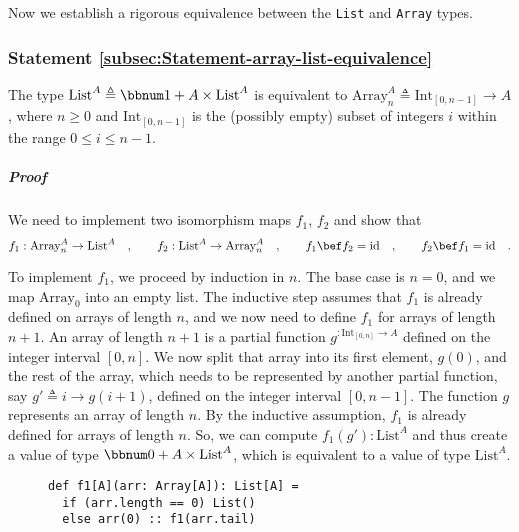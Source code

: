 Now we establish a rigorous equivalence between the \lstinline!List!
and \lstinline!Array! types.

\subsubsection{Statement \label{subsec:Statement-array-list-equivalence}\ref{subsec:Statement-array-list-equivalence}}

The type $\text{List}^{A}\triangleq\bbnum 1+A\times\text{List}^{A}$
is equivalent to $\text{Array}_{n}^{A}\triangleq\text{Int}_{[0,n-1]}\rightarrow A$,
where $n\geq0$ and $\text{Int}_{[0,n-1]}$ is the (possibly empty)
subset of integers $i$ within the range $0\leq i\leq n-1$.

\subparagraph{Proof}

We need to implement two isomorphism maps $f_{1}$, $f_{2}$ and show
that 
\[
f_{1}:\text{Array}_{n}^{A}\rightarrow\text{List}^{A}\quad,\quad\quad f_{2}:\text{List}^{A}\rightarrow\text{Array}_{n}^{A}\quad,\quad\quad f_{1}\bef f_{2}=\text{id}\quad,\quad\quad f_{2}\bef f_{1}=\text{id}\quad.
\]

To implement $f_{1}$, we proceed by induction in $n$. The base case
is $n=0$, and we map $\text{Array}_{0}$ into an empty list. The
inductive step assumes that $f_{1}$ is already defined on arrays
of length $n$, and we now need to define $f_{1}$ for arrays of length
$n+1$. An array of length $n+1$ is a partial function $g^{:\text{Int}_{[0,n]}\rightarrow A}$
defined on the integer interval $[0,n]$. We now split that array
into its first element, $g(0)$, and the rest of the array, which
needs to be represented by another partial function, say $g'\triangleq i\rightarrow g(i+1)$,
defined on the integer interval $[0,n-1]$. The function $g$ represents
an array of length $n$. By the inductive assumption, $f_{1}$ is
already defined for arrays of length $n$. So, we can compute $f_{1}(g'):\text{List}^{A}$
and thus create a value of type $\bbnum 0+A\times\text{List}^{A}$,
which is equivalent to a value of type $\text{List}^{A}$.

\begin{wrapfigure}{l}{0.4\columnwidth}%
\vspace{-0.75\baselineskip}
\begin{lstlisting}
def f1[A](arr: Array[A]): List[A] =
  if (arr.length == 0) List()
  else arr(0) :: f1(arr.tail)
\end{lstlisting}

\vspace{-1.25\baselineskip}
\end{wrapfigure}%

